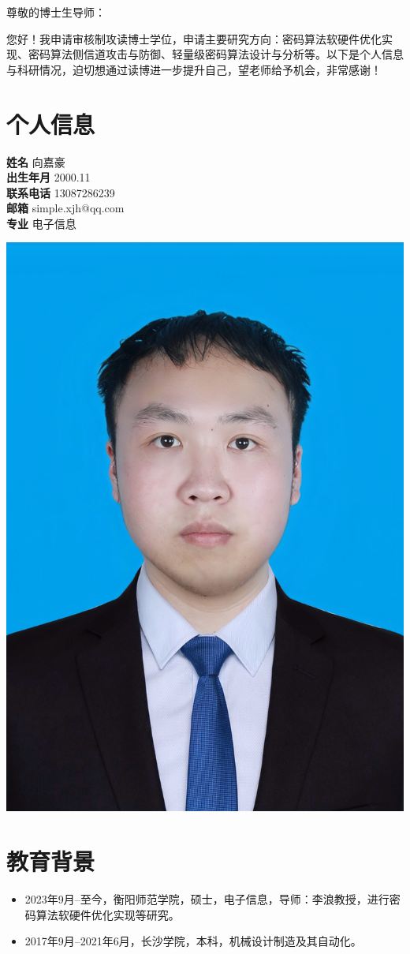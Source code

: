 \documentclass[12pt,a4paper]{article}
\newcommand{\ResumeItem}[2]{\noindent\textbf{#1} \hfill {\small #2}\\}
\begin{document}
{
  \noindent
  尊敬的博士生导师：

  您好！我申请审核制攻读博士学位，申请主要研究方向：密码算法软硬件优化实现、密码算法侧信道攻击与防御、轻量级密码算法设计与分析等。以下是个人信息与科研情况，迫切想通过读博进一步提升自己，望老师给予机会，非常感谢！
  \vspace{1em}
  \normalsize
}

\section*{个人信息}

\begin{center}
  \begin{minipage}[t]{0.63\textwidth}
    \vspace{0pt} %
    \centering
    \ResumeItem{姓名}{向嘉豪}
    \ResumeItem{出生年月}{2000.11}
    \ResumeItem{联系电话}{13087286239}
    \ResumeItem{邮箱}{simple.xjh@qq.com}
    \ResumeItem{专业}{电子信息}
  \end{minipage}%
  \hspace{1em}
  \begin{minipage}[t]{0.33\textwidth}
    \vspace{0pt} %
    \hspace{7em}
    \includegraphics[width=0.4\linewidth]{../image.jpg}
  \end{minipage}
\end{center}

\section*{教育背景}
{
  \begin{itemize}[leftmargin=2em]
    \item 2023年9月--至今，衡阳师范学院，硕士，电子信息，导师：李浪教授，进行密码算法软硬件优化实现等研究。
    \item 2017年9月--2021年6月，长沙学院，本科，机械设计制造及其自动化。
  \end{itemize}

}
\end{document}
